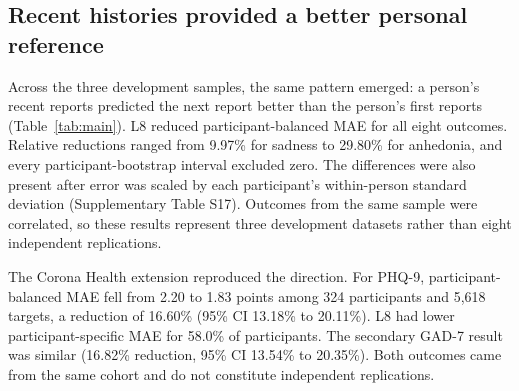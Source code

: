 \documentclass[pdflatex,sn-vancouver-num]{sn-jnl}
\begin{document}
\subsection{Recent histories provided a better personal reference}

Across the three development samples, the same pattern emerged: a person's recent reports predicted the next report better than the person's first reports (Table~\ref{tab:main}). L8 reduced participant-balanced MAE for all eight outcomes. Relative reductions ranged from 9.97\% for sadness to 29.80\% for anhedonia, and every participant-bootstrap interval excluded zero. The differences were also present after error was scaled by each participant's within-person standard deviation (Supplementary Table S17). Outcomes from the same sample were correlated, so these results represent three development datasets rather than eight independent replications.

The Corona Health extension reproduced the direction. For PHQ-9, participant-balanced MAE fell from 2.20 to 1.83 points among 324 participants and 5,618 targets, a reduction of 16.60\% (95\% CI 13.18\% to 20.11\%). L8 had lower participant-specific MAE for 58.0\% of participants. The secondary GAD-7 result was similar (16.82\% reduction, 95\% CI 13.54\% to 20.35\%). Both outcomes came from the same cohort and do not constitute independent replications.
\end{document}
